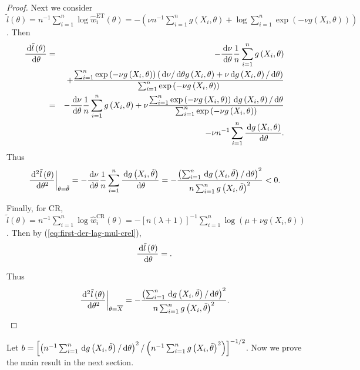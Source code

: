 \begin{proof}
Next we consider $\tilde{l}\left(\theta\right)=n^{-1}\sum_{i=1}^{n}\log\hat{w}_{i}^{\mathrm{ET}}\left(\theta\right)=-\left(\nu n^{-1}\sum_{i=1}^{n}g\left(X_{i},\theta\right)+\log\sum_{i=1}^{n}\exp\left(-\nu g\left(X_{i},\theta\right)\right)\right)$.
Then 
\begin{eqnarray*}
\frac{\,\mathrm{d}\tilde{l}\left(\theta\right)}{\,\mathrm{d}\theta} & = & -\frac{\,\mathrm{d}\nu}{\,\mathrm{d}\theta}\frac{1}{n}\sum_{i=1}^{n}g\left(X_{i},\theta\right)\\
 &  & +\frac{\sum_{i=1}^{n}\exp\left(-\nu g\left(X_{i},\theta\right)\right)\left(\,\mathrm{d}\nu/\,\mathrm{d}\theta g\left(X_{i},\theta\right)+\nu\,\mathrm{d} g\left(X_{i},\theta\right)/\,\mathrm{d}\theta\right)}{\sum_{i=1}^{n}\exp\left(-\nu g\left(X_{i},\theta\right)\right)}\\
 & = & -\frac{\,\mathrm{d}\nu}{\,\mathrm{d}\theta}\frac{1}{n}\sum_{i=1}^{n}g\left(X_{i},\theta\right)+\nu\frac{\sum_{i=1}^{n}\exp\left(-\nu g\left(X_{i},\theta\right)\right)\,\mathrm{d} g\left(X_{i},\theta\right)/\,\mathrm{d}\theta}{\sum_{i=1}^{n}\exp\left(-\nu g\left(X_{i},\theta\right)\right)}\\
 &  & -\nu n^{-1}\sum_{i=1}^{n}\frac{\,\mathrm{d} g\left(X_{i},\theta\right)}{\,\mathrm{d}\theta}.
\end{eqnarray*}
Thus 
\[
\left.\frac{\,\mathrm{d}^{2}\tilde{l}\left(\theta\right)}{\,\mathrm{d}\theta^{2}}\right|_{\theta=\tilde{\theta}}=-\frac{\,\mathrm{d}\nu}{\,\mathrm{d}\theta}\frac{1}{n}\sum_{i=1}^{n}\frac{\,\mathrm{d} g\left(X_{i},\tilde{\theta}\right)}{\,\mathrm{d}\theta}=-\frac{\left(\sum_{i=1}^{n}\,\mathrm{d} g\left(X_{i},\tilde{\theta}\right)/\,\mathrm{d}\theta\right)^{2}}{n\sum_{i=1}^{n}g\left(X_{i},\tilde{\theta}\right)^{2}}<0.
\]


Finally, for CR, $\tilde{l}\left(\theta\right)=n^{-1}\sum_{i=1}^{n}\log\hat{w}_{i}^{\mathrm{CR}}\left(\theta\right)=-\left[n\left(\lambda+1\right)\right]^{-1}\sum_{i=1}^{n}\log\left(\mu+\nu g\left(X_{i},\theta\right)\right)$.
Then by (\ref{eq:first-der-lag-mul-crel}), 
\[
\frac{\,\mathrm{d}\tilde{l}\left(\theta\right)}{\,\mathrm{d}\theta}=.
\]
\begin{comment}
need to compute the first and second order derivative
\end{comment}
Thus 
\[
\left.\frac{\,\mathrm{d}^{2}\tilde{l}\left(\theta\right)}{\,\mathrm{d}\theta^{2}}\right|_{\theta=\overline{X}}=-\frac{\left(\sum_{i=1}^{n}\,\mathrm{d} g\left(X_{i},\tilde{\theta}\right)/\,\mathrm{d}\theta\right)^{2}}{n\sum_{i=1}^{n}g\left(X_{i},\tilde{\theta}\right)^{2}}.
\]

\end{proof}
Let $b=\left[\left(n^{-1}\sum_{i=1}^{n}\,\mathrm{d} g\left(X_{i},\tilde{\theta}\right)/\,\mathrm{d}\theta\right)^{2}/\left(n^{-1}\sum_{i=1}^{n}g\left(X_{i},\tilde{\theta}\right)^{2}\right)\right]^{-1/2}$.
Now we prove the main result in the next section.


